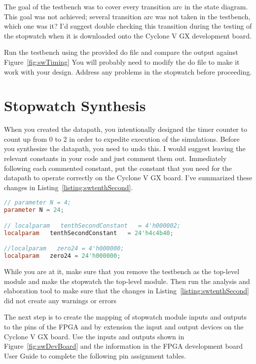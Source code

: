 The goal of the testbench was to cover every transition arc in the state
diagram. This goal was not achieved; several transition arc was not
taken in the testbench, which one was it? I'd suggest double checking
this transition during the testing of the stopwatch when it is
downloaded onto the Cyclone V GX development board.

Run the testbench using the provided do file and compare the output
against Figure~\ref{fig:swTiming} You will probably need to modify the do
file to make it work with your design. Address any problems in the
stopwatch before proceeding.

\section{Stopwatch Synthesis}

When you created the datapath, you intentionally designed the timer
counter to count up from 0 to 2 in order to expedite execution of the
simulations. Before you synthesize the datapath, you need to undo this.
I would suggest leaving the relevant constants in your code and just
comment them out. Immediately following each commented constant, put the
constant that you need for the datapath to operate correctly on the
Cyclone V GX board. I've summarized these changes in Listing~\ref{listing:swtenthSecond}.

\begin{lstlisting}[language=Verilog,
 caption={Changes to the datapath that will allow it to run properly on the Cyclone V GX development board.},
 label={listing:swtenthSecond},
 frame=single]
// parameter N = 4;	
parameter N = 24;	

// localparam   tenthSecondConstant   = 4'h000002;
localparam   tenthSecondConstant   = 24'h4c4b40;

//localparam   zero24 = 4'h000000;
localparam   zero24 = 24'h000000;
\end{lstlisting}


While you are at it, make sure that you remove the testbench as the
top-level module and make the stopwatch the top-level module. Then run
the analysis and elaboration tool to make sure that the changes in
Listing~\ref{listing:swtenthSecond} did not create any warnings or errors

The next step is to create the mapping of stopwatch module inputs and
outputs to the pins of the FPGA and by extension the input and output
devices on the Cyclone V GX board. Use the inputs and outputs shown in
Figure~\ref{fig:swDevBoard} and the information in the FPGA development board User Guide to complete
the following pin assignment tables.

